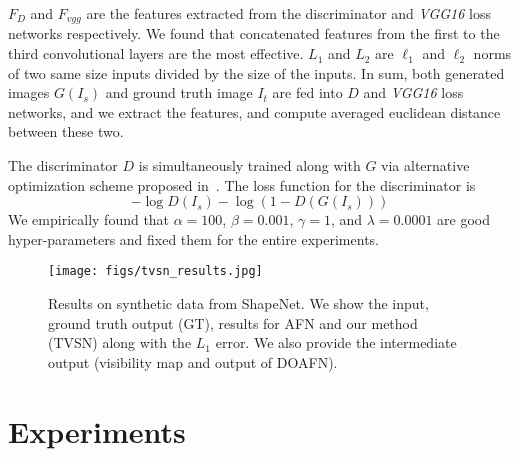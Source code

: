 \documentclass[10pt,twocolumn,letterpaper]{article}
\begin{document}
$F_D$ and $F_{vgg}$ are the features extracted from the discriminator and \textit{VGG16} loss networks respectively. We found that concatenated features from the first to the third convolutional layers are the most effective. $L_1$ and $L_2$ are $\ell_1$ and $\ell_2$ norms of two same size inputs divided by the size of the inputs. In sum, both generated images $G(I_s)$ and ground truth image $I_t$ are fed into $D$ and \textit{VGG16} loss networks, and we extract the features, and compute averaged euclidean distance between these two. 

The discriminator $D$ is simultaneously trained along with $G$ via alternative optimization scheme proposed in~\cite{Goodfellow_nips2014}. The loss function for the discriminator is 
\begin{equation}
-\log D(I_s) - \log (1-D(G(I_s)))
\end{equation}
We empirically found that $\alpha=100$, $\beta=0.001$, $\gamma=1$, and $\lambda=0.0001$ are good hyper-parameters and fixed them for the entire experiments.

\begin{figure}[t]
\begin{center}
\texttt{[image: figs/tvsn\_results.jpg]}
\end{center}
\caption{Results on synthetic data from ShapeNet. We show the input, ground truth output (GT), results for AFN and our method (TVSN) along with the $L_1$ error. We also provide the intermediate output (visibility map and output of DOAFN).}
\label{fig:tvsn_results}
\vspace{-2mm}
\vspace{-2mm}
\end{figure}

\section{Experiments}
\end{document}
